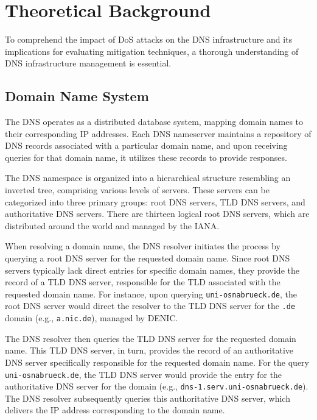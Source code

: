 \section{Theoretical Background} \label{sec:dnsandanycast}
To comprehend the impact of \ac{DoS} attacks on the \ac{DNS} infrastructure and its implications for evaluating mitigation techniques, a thorough understanding of DNS infrastructure management is essential.


\subsection{Domain Name System} \label{subsec:dns}
The \acf{DNS} operates as a distributed database system, mapping domain names to their corresponding IP addresses.
Each DNS nameserver maintains a repository of DNS records associated with a particular domain name, and upon receiving queries for that domain name, it utilizes these records to provide responses.

The DNS namespace is organized into a hierarchical structure resembling an inverted tree, comprising various levels of servers.
These servers can be categorized into three primary groups: root DNS servers, \acf{TLD} DNS servers, and authoritative DNS servers.
There are thirteen logical root DNS servers, which are distributed around the world and managed by the \ac{IANA}.

When resolving a domain name, the DNS resolver initiates the process by querying a root DNS server for the requested domain name.
Since root DNS servers typically lack direct entries for specific domain names, they provide the record of a \ac{TLD} DNS server, responsible for the \ac{TLD} associated with the requested domain name.
For instance, upon querying \texttt{uni-osnabrueck.de}, the root DNS server would direct the resolver to the \ac{TLD} DNS server for the \texttt{.de} domain (e.g., \texttt{a.nic.de}), managed by DENIC.

The DNS resolver then queries the \ac{TLD} DNS server for the requested domain name.
This \ac{TLD} DNS server, in turn, provides the record of an authoritative DNS server specifically responsible for the requested domain name.
For the query \texttt{uni-osnabrueck.de}, the \ac{TLD} DNS server would provide the entry for the authoritative DNS server for the domain (e.g., \texttt{dns-1.serv.uni-osnabrueck.de}).
The DNS resolver subsequently queries this authoritative DNS server, which delivers the IP address corresponding to the domain name.

